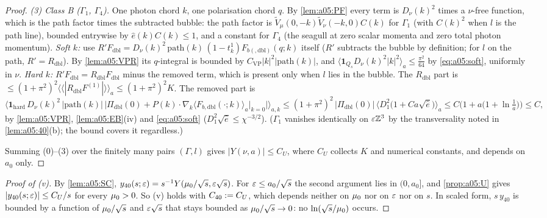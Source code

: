 \begin{proof}
\emph{(3) Class B ($\Gamma_1$, $\Gamma_4$).} One photon chord $k$, one polarisation chord $q$. By \cref{lem:a05:PF} every term is $D_\nu(k)^2$ times a $\nu$-free function, which is the path factor times the subtracted bubble: the path factor is $\tilde V_\mu(0,-k)\tilde V_\nu(-k,0)C(k)$ for $\Gamma_1$ (with $C(k)^2$ when $l$ is the path line), bounded entrywise by $\hat e(k)C(k)\le1$, and a constant for $\Gamma_4$ (the seagull at zero scalar momenta and zero total photon momentum). \emph{Soft $k$:} use $R'F_{\mathrm{dbl}}=D_\nu(k)^2\,\mathrm{path}(k)\,(1-t^1_k)F_{b(,\mathrm{dbl})}(q;k)$ itself ($R'$ subtracts the bubble by definition; for $l$ on the path, $R'=R_{\mathrm{dbl}}$). By \cref{lem:a05:VPR} its $q$-integral is bounded by $C_{\mathrm{VP}}|k|^2|\mathrm{path}(k)|$, and $\langle\mathbf 1_{Q_s}D_\nu(k)^2|k|^2\rangle_a\le\frac{\pi^2}{64}$ by \eqref{eq:a05:soft}, uniformly in $\nu$. \emph{Hard $k$:} $R'F_{\mathrm{dbl}}=R_{\mathrm{dbl}}F_{\mathrm{dbl}}$ minus the removed term, which is present only when $l$ lies in the bubble. The $R_{\mathrm{dbl}}$ part is $\le(1+\pi^2)^2\langle\langle|R_{\mathrm{dbl}}F^{(1)}|\rangle\rangle_a\le(1+\pi^2)^2K$. The removed part is
\[
\big\langle\mathbf 1_{\mathrm{hard}}\,D_\nu(k)^2\,|\mathrm{path}(k)|\,\big|\Pi_{\mathrm{dbl}}(0)+P(k)\cdot\nabla_k\langle F_{b,\mathrm{dbl}}(\cdot;k)\rangle_a\big|_{k=0}\big|\big\rangle_{a,k}
\le(1+\pi^2)^2\,|\Pi_{\mathrm{dbl}}(0)|\,\big\langle D_1^2\big(1+Ca\sqrt{\hat e}\big)\big\rangle_a\le C\Big(1+a\big(1+\ln\tfrac1a\big)\Big)\le C,
\]
by \cref{lem:a05:VPR}, \cref{lem:a05:EB}(iv) and \eqref{eq:a05:soft} ($D_1^2\sqrt{\hat e}\le\chi^{-3/2}$). ($\Gamma_1$ vanishes identically on $\varepsilon\mathbb Z^3$ by the transversality noted in \cref{lem:a05:40}(b); the bound covers it regardless.)

Summing (0)--(3) over the finitely many pairs $(\Gamma,l)$ gives $|Y(\nu,a)|\le C_U$, where $C_U$ collects $K$ and numerical constants, and depends on $a_0$ only.
\end{proof}

\begin{proof}[Proof of (v)]
By \cref{lem:a05:SC}, $y_{40}(s;\varepsilon)=s^{-1}Y(\mu_0/\sqrt s,\varepsilon\sqrt s)$. For $\varepsilon\le a_0/\sqrt s$ the second argument lies in $(0,a_0]$, and \cref{prop:a05:U} gives $|y_{40}(s;\varepsilon)|\le C_U/s$ for every $\mu_0>0$. So (v) holds with $C_{40}:= C_U$, which depends neither on $\mu_0$ nor on $\varepsilon$ nor on $s$. In scaled form, $s\,y_{40}$ is bounded by a function of $\mu_0/\sqrt s$ and $\varepsilon\sqrt s$ that stays bounded as $\mu_0/\sqrt s\to0$: no $\ln(\sqrt s/\mu_0)$ occurs.
\end{proof}
